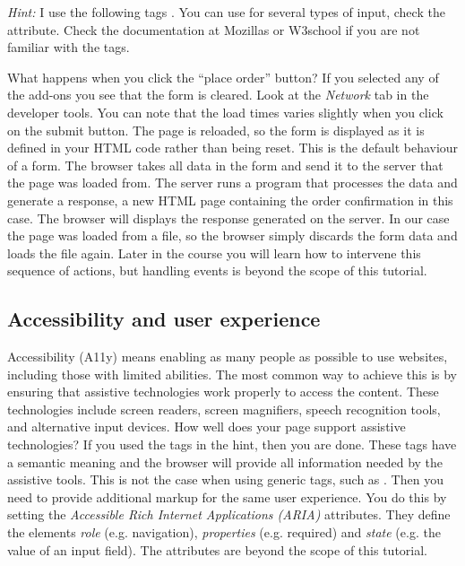 \documentclass[fleqn, article, a4paper]{memoir}
\begin{document}
\emph{Hint:} I use the following tags . You can use  for several types of input, check the  attribute. Check the documentation at Mozillas or W3school if you are not familiar with the tags.

What happens when you click the ``place order'' button? If you selected any of the add-ons you see that the form is cleared. Look at the \emph{Network} tab in the developer tools.  You can note that the load times varies slightly when you click on the submit button. The page is reloaded, so the form is displayed as it is defined in your HTML code rather than being reset. This is the default behaviour of a form. The browser takes all data in the form and send it to the server that the page was loaded from. The server runs a program that processes the data and generate a response, a new HTML page containing the order confirmation in this case. The browser will displays the response generated on the server. In our case the page was loaded from a file, so the browser simply discards the form data and loads the file again. Later in the course you will learn how to intervene this sequence of actions, but handling events is beyond the scope of this tutorial.

\subsection*{Accessibility and user experience}
Accessibility (A11y) means enabling as many people as possible to use websites, including those with limited abilities. The most common way to achieve this is by ensuring that assistive technologies work properly to access the content. These technologies include screen readers, screen magnifiers, speech recognition tools, and alternative input devices. How well does your page support assistive technologies? If you used the tags in the hint, then you are done. These tags have a semantic meaning and the browser will provide all information needed by the assistive tools. This is not the case when using generic tags, such as . Then you need to provide additional markup for the same user experience. You do this by setting the \emph{Accessible Rich Internet Applications (ARIA)} attributes. They define the elements \emph{role} (e.g. navigation), \emph{properties} (e.g. required) and \emph{state} (e.g. the value of an input field). The  attributes are beyond the scope of this tutorial.
\end{document}
